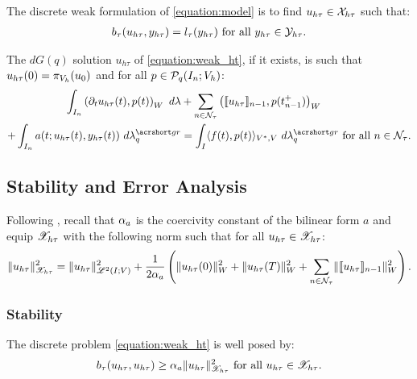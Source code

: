 \begin{definition}
    The discrete weak formulation of \ref{equation:model} is to find $u_{h \tau} \in \mathcal{X}_{h \tau}$ such that:
    \begin{gather} \label{equation:weak_ht}
        b_{\tau}(u_{h \tau}, y_{h \tau}) = l_{\tau}(y_{h \tau}) \text{ for all } y_{h \tau} \in \mathcal{Y}_{h \tau}.
    \end{gather}
\end{definition}

\begin{proposition}[Localization]
    The $dG(q)$ solution $u_{h \tau}$ of \eqref{equation:weak_ht}, if it exists, is such that $u_{h \tau}(0) = \pi_{V_h}(u_0)$ and for all $p \in \mathcal{P}_{q}(I_n; V_h)$:
    \begin{align}
        \int_{I_n} \left( \partial_t u_{h \tau}(t), p(t) \right)_W ~ d \lambda & + \sum_{n \in \TimeIndices} \left( \llbracket u_{h \tau} \rrbracket_{n - 1}, p(t_{n - 1}^+) \right)_W \notag \\
        + \int_{I_n} a(t; u_{h \tau}(t), y_{h \tau}(t)) ~ d \lambdaGR_q & = \int_I \langle f(t), p(t) \rangle_{V^*, V} ~ d \lambdaGR_q \text{ for all } n \in \TimeIndices.
    \end{align}
\end{proposition}

\newpage
\subsection{Stability and Error Analysis}

Following \cite[p. 186]{Ern2021}, recall that $\alpha_{a}$ is the coercivity constant of the bilinear form $a$ and equip $\mathscr{X}_{h \tau}$ with the following norm such that for all $u_{h \tau} \in \mathscr{X}_{h \tau}$:
\begin{gather}
    \lVert u_{h \tau} \rVert_{\mathscr{X}_{h \tau}}^2 = \lVert u_{h \tau} \rVert_{\mathscr{L}^{2}(I; V)}^2 + \frac{1}{2 \alpha_{a}} \left( \lVert u_{h \tau}(0) \rVert_W^2 + \lVert u_{h \tau}(T) \rVert_W^2 + \sum_{n \in \mathcal{N}_{\tau}} \lVert \llbracket u_{h \tau} \rrbracket_{n - 1} \rVert_W^2 \right).
\end{gather}

\subsubsection{Stability}

\begin{lemma}[Coercivity]
    The discrete problem \eqref{equation:weak_ht} is well posed by:
    \begin{gather}
        b_{\tau}(u_{h \tau}, u_{h \tau}) \geq \alpha_{a} \lVert u_{h \tau} \rVert_{\mathscr{X}_{h \tau}}^2 \text{ for all } u_{h \tau} \in \mathscr{X}_{h \tau}.
    \end{gather}
\end{lemma}

